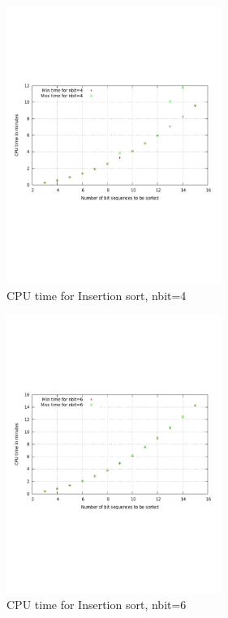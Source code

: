 \documentclass{acm_proc_article-sp}
\begin{document}
\begin{figure}[!h]%
\centering
\includegraphics[width=7cm]{fsort6.pdf} 
\caption{CPU time for Insertion sort, nbit=4} 
\label{fig:image_sf6} %
\end{figure}


\begin{figure}[!H] %
\centering
\includegraphics[width=7cm]{fsort8.pdf} 
\caption{CPU time for Insertion sort, nbit=6} 
\label{fig:image_sf8} %
\end{figure}
\end{document}
